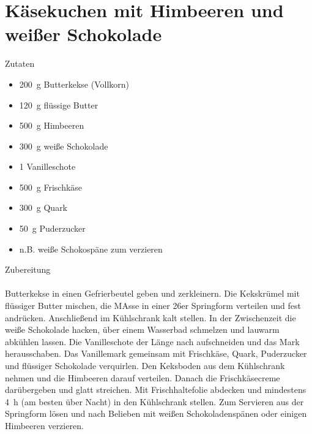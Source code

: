 \section*{Käsekuchen mit Himbeeren und weißer Schokolade}
\ihead{}\ohead{}
\cfoot{}
{\Large Zutaten}
\begin{multicols}{2}
\begin{itemize}
    \item \SI{200}{g} Butterkekse (Vollkorn)
    \item \SI{120}{g} flüssige Butter
    \item \SI{500}{g} Himbeeren
    \item \SI{300}{g} weiße Schokolade
    \item \num{1} Vanilleschote
    \item \SI{500}{g} Frischkäse
    \item \SI{300}{g} Quark
    \item \SI{50}{g} Puderzucker
    \item n.B. weiße Schokospäne zum verzieren
\end{itemize}
\end{multicols}
\noindent
{\Large Zubereitung}\\
\\
Butterkekse in einen Gefrierbeutel geben und zerkleinern.
Die Kekskrümel mit flüssiger Butter mischen, die MAsse in einer \num{26}er Springform verteilen und fest andrücken.
Anschließend im Kühlschrank kalt stellen.
In der Zwischenzeit die weiße Schokolade hacken, über einem Wasserbad schmelzen und lauwarm abkühlen lassen.
Die Vanilleschote der Länge nach aufschneiden und das Mark herausschaben.
Das Vanillemark gemeinsam mit Frischkäse, Quark, Puderzucker und flüssiger Schokolade verquirlen.
Den Keksboden aus dem Kühlschrank nehmen und die Himbeeren darauf verteilen.
Danach die Frischkäsecreme darübergeben und glatt streichen.
Mit Frischhaltefolie abdecken und mindestens \SI{4}{h} (am besten über Nacht) in den Kühlschrank stellen.
Zum Servieren aus der Springform lösen und nach Belieben mit weißen Schokoladenspänen oder einigen Himbeeren verzieren.